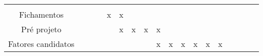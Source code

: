 \begin{table}[h]
{\begin{tabular}{ l l l l l l l l l l l l l l l l l l }
    \multicolumn{1}{c|}{ } &
    \multicolumn{1}{c|}{ } &
    \multicolumn{1}{c|}{ }
  \\  
  \cline{1-1}\cline{2-2}\cline{3-3}\cline{4-4}\cline{5-5}\cline{6-6}\cline{7-7}\cline{8-8}\cline{9-9}\cline{10-10}\cline{11-11}\cline{12-12}\cline{13-13}\cline{14-14}\cline{15-15}\cline{16-16}\cline{17-17}\cline{18-18}  
    \multicolumn{1}{|c|}{Fichamentos} &
    \multicolumn{1}{c|}{ } &
    \multicolumn{1}{c|}{ } &
    \multicolumn{1}{c|}{ } &
    \multicolumn{1}{c|}{x} &
    \multicolumn{1}{c|}{x} &
    \multicolumn{1}{c|}{ } &
    \multicolumn{1}{c|}{ } &
    \multicolumn{1}{c|}{ } &
    \multicolumn{1}{c|}{ } &
    \multicolumn{1}{c|}{ } &
    \multicolumn{1}{c|}{ } &
    \multicolumn{1}{c|}{ } &
    \multicolumn{1}{c|}{ } &
    \multicolumn{1}{c|}{ } &
    \multicolumn{1}{c|}{ } &
    \multicolumn{1}{c|}{ } &
    \multicolumn{1}{c|}{ }
  \\  
  \cline{1-1}\cline{2-2}\cline{3-3}\cline{4-4}\cline{5-5}\cline{6-6}\cline{7-7}\cline{8-8}\cline{9-9}\cline{10-10}\cline{11-11}\cline{12-12}\cline{13-13}\cline{14-14}\cline{15-15}\cline{16-16}\cline{17-17}\cline{18-18}  
    \multicolumn{1}{|c|}{Pré projeto} &
    \multicolumn{1}{c|}{ } &
    \multicolumn{1}{c|}{ } &
    \multicolumn{1}{c|}{ } &
    \multicolumn{1}{c|}{ } &
    \multicolumn{1}{c|}{x} &
    \multicolumn{1}{c|}{x} &
    \multicolumn{1}{c|}{x} &
    \multicolumn{1}{c|}{x} &
    \multicolumn{1}{c|}{ } &
    \multicolumn{1}{c|}{ } &
    \multicolumn{1}{c|}{ } &
    \multicolumn{1}{c|}{ } &
    \multicolumn{1}{c|}{ } &
    \multicolumn{1}{c|}{ } &
    \multicolumn{1}{c|}{ } &
    \multicolumn{1}{c|}{ } &
    \multicolumn{1}{c|}{ }
  \\  
  \cline{1-1}\cline{2-2}\cline{3-3}\cline{4-4}\cline{5-5}\cline{6-6}\cline{7-7}\cline{8-8}\cline{9-9}\cline{10-10}\cline{11-11}\cline{12-12}\cline{13-13}\cline{14-14}\cline{15-15}\cline{16-16}\cline{17-17}\cline{18-18}  
    \multicolumn{1}{|c|}{Fatores candidatos} &
    \multicolumn{1}{c|}{ } &
    \multicolumn{1}{c|}{ } &
    \multicolumn{1}{c|}{ } &
    \multicolumn{1}{c|}{ } &
    \multicolumn{1}{c|}{ } &
    \multicolumn{1}{c|}{ } &
    \multicolumn{1}{c|}{ } &
    \multicolumn{1}{c|}{x} &
    \multicolumn{1}{c|}{x} &
    \multicolumn{1}{c|}{x} &
    \multicolumn{1}{c|}{x} &
    \multicolumn{1}{c|}{x} &
    \multicolumn{1}{c|}{x} &
    \multicolumn{1}{c|}{ } &
    \multicolumn{1}{c|}{ } &
    \multicolumn{1}{c|}{ } &
    \multicolumn{1}{c|}{ }
  \\  
  \cline{1-1}\cline{2-2}\cline{3-3}\cline{4-4}\cline{5-5}\cline{6-6}\cline{7-7}\cline{8-8}\cline{9-9}\cline{10-10}\cline{11-11}\cline{12-12}\cline{13-13}\cline{14-14}\cline{15-15}\cline{16-16}\cline{17-17}\cline{18-18}  

\end{tabular}}
\end{table}
